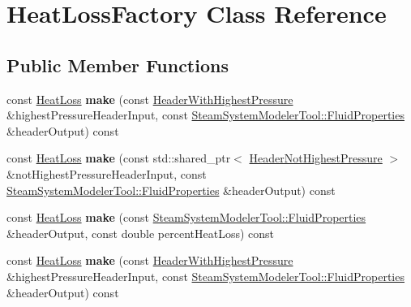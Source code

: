 \hypertarget{class_heat_loss_factory}{}\section{Heat\+Loss\+Factory Class Reference}
\label{class_heat_loss_factory}
\subsection*{Public Member Functions}
\begin{DoxyCompactItemize}
\item 
\mbox{\label{class_heat_loss_factory_aada0db1774fa97be20045472abd120a4}} 
const \hyperlink{class_heat_loss}{Heat\+Loss} {\bfseries make} (const \hyperlink{class_header_with_highest_pressure}{Header\+With\+Highest\+Pressure} \&highest\+Pressure\+Header\+Input, const \hyperlink{struct_steam_system_modeler_tool_1_1_fluid_properties}{Steam\+System\+Modeler\+Tool\+::\+Fluid\+Properties} \&header\+Output) const
\item 
\mbox{\label{class_heat_loss_factory_a8e518177317bf65d0658d171fdeb8d65}} 
const \hyperlink{class_heat_loss}{Heat\+Loss} {\bfseries make} (const std\+::shared\+\_\+ptr$<$ \hyperlink{class_header_not_highest_pressure}{Header\+Not\+Highest\+Pressure} $>$ \&not\+Highest\+Pressure\+Header\+Input, const \hyperlink{struct_steam_system_modeler_tool_1_1_fluid_properties}{Steam\+System\+Modeler\+Tool\+::\+Fluid\+Properties} \&header\+Output) const
\item 
\mbox{\label{class_heat_loss_factory_a64e610fc112e14ab36a245d5ee365d84}} 
const \hyperlink{class_heat_loss}{Heat\+Loss} {\bfseries make} (const \hyperlink{struct_steam_system_modeler_tool_1_1_fluid_properties}{Steam\+System\+Modeler\+Tool\+::\+Fluid\+Properties} \&header\+Output, const double percent\+Heat\+Loss) const
\item 
\mbox{\label{class_heat_loss_factory_aada0db1774fa97be20045472abd120a4}} 
const \hyperlink{class_heat_loss}{Heat\+Loss} {\bfseries make} (const \hyperlink{class_header_with_highest_pressure}{Header\+With\+Highest\+Pressure} \&highest\+Pressure\+Header\+Input, const \hyperlink{struct_steam_system_modeler_tool_1_1_fluid_properties}{Steam\+System\+Modeler\+Tool\+::\+Fluid\+Properties} \&header\+Output) const

\end{DoxyCompactItemize}
